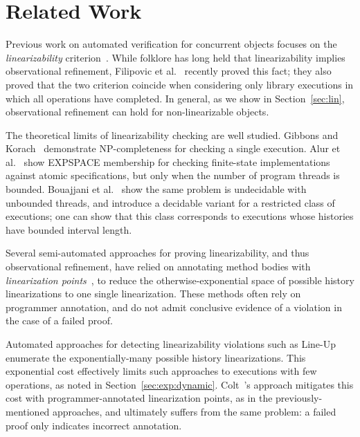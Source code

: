 \section{Related Work}
\label{sec:related}


Previous work on automated verification for concurrent objects focuses on the
\emph{linearizability} criterion~\citep{journals/toplas/HerlihyW90}. While
folklore has long held that linearizability implies observational refinement,
Filipovic et al.~\cite{journals/tcs/FilipovicORY10} recently proved this fact;
they also proved that the two criterion coincide when considering only library
executions in which all operations have completed. In general, as we show in
Section~\ref{sec:lin}, observational refinement can hold for non-linearizable
objects.

The theoretical limits of linearizability checking are well studied. Gibbons
and Korach~\cite{journals/siamcomp/GibbonsK97} demonstrate NP-completeness for
checking a single execution. Alur et al.~\cite{journals/iandc/AlurMP00} show
EXPSPACE membership for checking finite-state implementations against atomic
specifications, but only when the number of program threads is bounded.
Bouajjani et al.~\cite{conf/esop/BouajjaniEEH13} show the same problem is
undecidable with unbounded threads, and introduce a decidable variant for a
restricted class of executions; one can show that this class corresponds to
executions whose histories have bounded interval length.

Several semi-automated approaches for proving linearizability, and thus
observational refinement, have relied on annotating method bodies with
\emph{linearization points}~\cite{conf/cav/AmitRRSY07, conf/fm/LiuCLS09,
conf/podc/OHearnRVYY10, conf/cav/Vafeiadis10, conf/icse/Zhang11a,
conf/pldi/LiangF13, conf/cav/DragoiGH13}, to reduce the otherwise-exponential
space of possible history linearizations to one single linearization. These
methods often rely on programmer annotation, and do not admit conclusive
evidence of a violation in the case of a failed proof.

Automated approaches for detecting linearizability violations such as
Line-Up~\cite{conf/pldi/BurckhardtDMT10} enumerate the exponentially-many
possible history linearizations. This exponential cost effectively limits such
approaches to executions with few operations, as noted in
Section~\ref{sec:exp:dynamic}. Colt~\cite{conf/oopsla/ShachamBASVY11}'s
approach mitigates this cost with programmer-annotated linearization points, as
in the previously-mentioned approaches, and ultimately suffers from the same
problem: a failed proof only indicates incorrect annotation.

